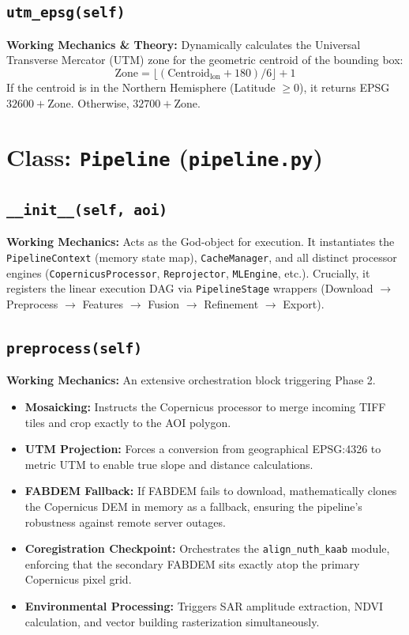 \documentclass[11pt,a4paper,oneside]{report}
\begin{document}
\subsection{\texttt{utm\_epsg(self)}}
\textbf{Working Mechanics \& Theory:} Dynamically calculates the Universal Transverse Mercator (UTM) zone for the geometric centroid of the bounding box:
\begin{equation}
    \text{Zone} = \lfloor (\text{Centroid}_{\text{lon}} + 180) / 6 \rfloor + 1
\end{equation}
If the centroid is in the Northern Hemisphere (Latitude $\ge 0$), it returns EPSG $32600 + \text{Zone}$. Otherwise, $32700 + \text{Zone}$.

\section{Class: \texttt{Pipeline} (\texttt{pipeline.py})}
\subsection{\texttt{\_\_init\_\_(self, aoi)}}
\textbf{Working Mechanics:} Acts as the God-object for execution. It instantiates the \texttt{PipelineContext} (memory state map), \texttt{CacheManager}, and all distinct processor engines (\texttt{CopernicusProcessor}, \texttt{Reprojector}, \texttt{MLEngine}, etc.). Crucially, it registers the linear execution DAG via \texttt{PipelineStage} wrappers (Download $\rightarrow$ Preprocess $\rightarrow$ Features $\rightarrow$ Fusion $\rightarrow$ Refinement $\rightarrow$ Export).

\subsection{\texttt{preprocess(self)}}
\textbf{Working Mechanics:} An extensive orchestration block triggering Phase 2.
\begin{itemize}
    \item \textbf{Mosaicking:} Instructs the Copernicus processor to merge incoming TIFF tiles and crop exactly to the AOI polygon.
    \item \textbf{UTM Projection:} Forces a conversion from geographical EPSG:4326 to metric UTM to enable true slope and distance calculations.
    \item \textbf{FABDEM Fallback:} If FABDEM fails to download, mathematically clones the Copernicus DEM in memory as a fallback, ensuring the pipeline's robustness against remote server outages.
    \item \textbf{Coregistration Checkpoint:} Orchestrates the \texttt{align\_nuth\_kaab} module, enforcing that the secondary FABDEM sits exactly atop the primary Copernicus pixel grid.
    \item \textbf{Environmental Processing:} Triggers SAR amplitude extraction, NDVI calculation, and vector building rasterization simultaneously.
\end{itemize}
\end{document}
